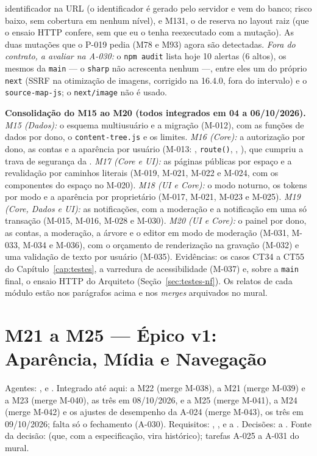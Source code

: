 identificador na URL (o identificador é gerado pelo servidor e vem do banco; risco baixo, sem cobertura em nenhum nível), e M131, o  de reserva no layout raiz (que o ensaio HTTP confere, sem que eu o tenha reexecutado com a mutação). As duas mutações que o P-019 pedia (M78 e M93) agora são detectadas. \emph{Fora do contrato, a avaliar na A-030:} o \texttt{npm audit} lista hoje 10 alertas (6 altos), os mesmos da \texttt{main} --- o \texttt{sharp} não acrescenta nenhum ---, entre eles um do próprio \texttt{next} (SSRF na otimização de imagens, corrigido na 16.4.0, fora do intervalo) e o \texttt{source-map-js}; o \texttt{next/image} não é usado.

\textbf{Consolidação do M15 ao M20 (todos integrados em 04 a 06/10/2026).} \emph{M15 (Dados):} o esquema multiusuário e a migração (M-012), com as funções de dados por dono, o \texttt{content-tree.js} e os limites. \emph{M16 (Core):} a autorização por dono, as contas e a aparência por usuário (M-013: , \texttt{route()}, , ), que cumpriu a trava de segurança da . \emph{M17 (Core e UI):} as páginas públicas por espaço e a revalidação por caminhos literais (M-019, M-021, M-022 e M-024, com os componentes do espaço no M-020). \emph{M18 (UI e Core):} o modo noturno, os tokens por modo e a aparência por proprietário (M-017, M-021, M-023 e M-025). \emph{M19 (Core, Dados e UI):} as notificações, com a moderação e a notificação em uma só transação (M-015, M-016, M-028 e M-030). \emph{M20 (UI e Core):} o painel por dono, as contas, a moderação, a árvore e o editor em modo de moderação (M-031, M-033, M-034 e M-036), com o orçamento de renderização na gravação (M-032) e uma validação de texto por usuário (M-035). Evidências: os casos CT34 a CT55 do Capítulo~\ref{cap:testes}, a varredura de acessibilidade (M-037) e, sobre a \texttt{main} final, o ensaio HTTP do Arquiteto (Seção~\ref{sec:testes-nf}). Os relatos de cada módulo estão nos parágrafos acima e nos \emph{merges} arquivados no mural.

\section{M21 a M25 --- Épico v1: Aparência, Mídia e Navegação}\label{sec:impl-epico-v1}

\noindent{}\quad Agentes: ,  e . Integrado até aqui: a M22 (merge M-038), a M21 (merge M-039) e a M23 (merge M-040), as três em 08/10/2026, e a M25 (merge M-041), a M24 (merge M-042) e os ajustes de desempenho da A-024 (merge M-043), os três em 09/10/2026; falta só o fechamento (A-030). Requisitos: , ,  e  a . Decisões:  a . Fonte da decisão:  (que, com a especificação, vira histórico); tarefas A-025 a A-031 do mural.

